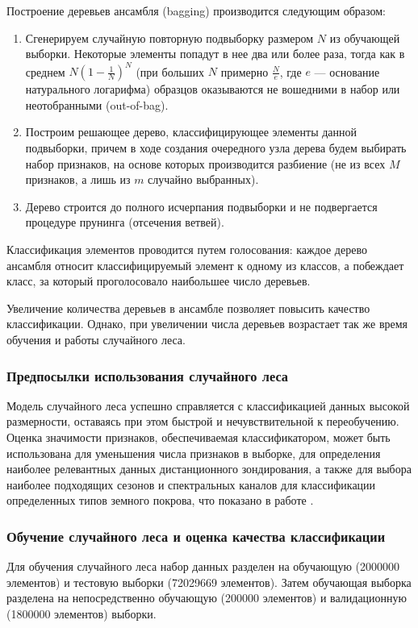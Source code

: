 \documentclass[14pt, a4paper, oneside]{extarticle}
\begin{document}
Построение деревьев ансамбля (bagging) производится следующим образом:
\begin{enumerate}
    \item Сгенерируем случайную повторную подвыборку размером $N$ из обучающей выборки. Некоторые элементы попадут в нее два или более раза, тогда как в среднем $N(1-\frac{1}{N})^N$ (при больших $N$ примерно $\frac{N}{e}$, где $e$ --- основание натурального логарифма) образцов оказываются не вошедними в набор или неотобранными (out-of-bag).
    \item Построим решающее дерево, классифицирующее элементы данной подвыборки, причем в ходе создания очередного узла дерева будем выбирать набор признаков, на основе которых производится разбиение (не из всех $M$ признаков, а лишь из $m$ случайно выбранных).
    \item Дерево строится до полного исчерпания подвыборки и не подвергается процедуре прунинга (отсечения ветвей).
\end{enumerate}

Классификация элементов проводится путем голосования: каждое дерево ансамбля относит классифицируемый элемент к одному из классов, а побеждает класс, за который проголосовало наибольшее число деревьев.

Увеличение количества деревьев в ансамбле позволяет повысить качество классификации. Однако, при увеличении числа деревьев возрастает так же время обучения и работы случайного леса.

\subsubsection{Предпосылки использования случайного леса}
Модель случайного леса успешно справляется с классификацией данных высокой размерности, оставаясь при этом быстрой и нечувствительной к переобучению. Оценка значимости признаков, обеспечиваемая классификатором, может быть использована для уменьшения числа признаков в выборке, для определения наиболее релевантных данных дистанционного зондирования, а также для выбора наиболее подходящих сезонов и спектральных каналов для классификации определенных типов земного покрова, что показано в работе \cite{random-forest-in-remote-sensing}.

\subsubsection{Обучение случайного леса и оценка качества классификации}
Для обучения случайного леса набор данных разделен на обучающую (2000000 элементов) и тестовую выборки (72029669 элементов). Затем обучающая выборка разделена на непосредственно обучающую (200000 элементов) и валидационную (1800000 элементов) выборки.
\end{document}
